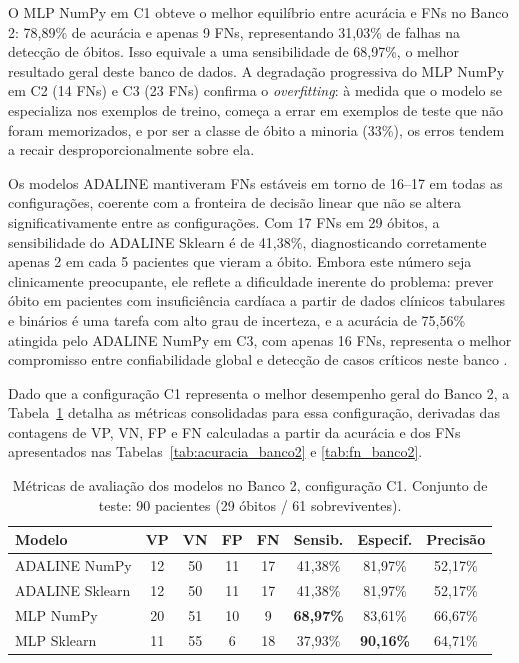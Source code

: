 O MLP NumPy em C1 obteve o melhor equilíbrio entre acurácia e FNs no Banco 2: 78,89\% de acurácia e apenas 9 FNs, representando 31,03\% de falhas na detecção de óbitos. Isso equivale a uma sensibilidade de 68,97\%, o melhor resultado geral deste banco de dados. A degradação progressiva do MLP NumPy em C2 (14 FNs) e C3 (23 FNs) confirma o \textit{overfitting}: à medida que o modelo se especializa nos exemplos de treino, começa a errar em exemplos de teste que não foram memorizados, e por ser a classe de óbito a minoria (33\%), os erros tendem a recair desproporcionalmente sobre ela.

Os modelos ADALINE mantiveram FNs estáveis em torno de 16--17 em todas as configurações, coerente com a fronteira de decisão linear que não se altera significativamente entre as configurações. Com 17 FNs em 29 óbitos, a sensibilidade do ADALINE Sklearn é de 41,38\%, diagnosticando corretamente apenas 2 em cada 5 pacientes que vieram a óbito. Embora este número seja clinicamente preocupante, ele reflete a dificuldade inerente do problema: prever óbito em pacientes com insuficiência cardíaca a partir de dados clínicos tabulares e binários é uma tarefa com alto grau de incerteza, e a acurácia de 75,56\% atingida pelo ADALINE NumPy em C3, com apenas 16 FNs, representa o melhor compromisso entre confiabilidade global e detecção de casos críticos neste banco \cite{chicco2020}.

Dado que a configuração C1 representa o melhor desempenho geral do Banco 2, a Tabela~\ref{tab:metricas_banco2_c1} detalha as métricas consolidadas para essa configuração, derivadas das contagens de VP, VN, FP e FN calculadas a partir da acurácia e dos FNs apresentados nas Tabelas~\ref{tab:acuracia_banco2} e \ref{tab:fn_banco2}.

\begin{table}[H]
\centering
\caption{Métricas de avaliação dos modelos no Banco 2, configuração C1. Conjunto de teste: 90 pacientes (29 óbitos / 61 sobreviventes).}
\label{tab:metricas_banco2_c1}
\begin{tabular}{|l|c|c|c|c|c|c|c|}
\hline
\textbf{Modelo} & \textbf{VP} & \textbf{VN} & \textbf{FP} & \textbf{FN} & \textbf{Sensib.} & \textbf{Especif.} & \textbf{Precisão} \\
\hline
ADALINE NumPy   & 12 & 50 & 11 & 17 & 41,38\% & 81,97\% & 52,17\% \\
ADALINE Sklearn & 12 & 50 & 11 & 17 & 41,38\% & 81,97\% & 52,17\% \\
MLP NumPy       & 20 & 51 & 10 &  9 & \textbf{68,97\%} & 83,61\% & 66,67\% \\
MLP Sklearn     & 11 & 55 &  6 & 18 & 37,93\% & \textbf{90,16\%} & 64,71\% \\
\hline
\end{tabular}
\end{table}

